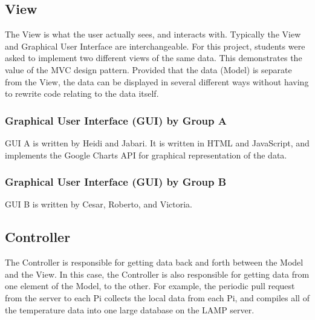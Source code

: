 \documentclass{article}
\begin{document}
		\subsection{View}
			The View is what the user actually sees, and interacts with. Typically the View and Graphical User Interface are interchangeable.
			For this project, students were asked to implement two different views of the same data. This demonstrates the value of
			the MVC design pattern. Provided that the data (Model) is separate from the View, the data can be displayed in several different
			ways without having to rewrite code relating to the data itself.		
		
			\subsubsection{Graphical User Interface (GUI) by Group A}
				GUI A is written by Heidi and Jabari. It is written in HTML and JavaScript, and implements the Google Charts API
				for graphical representation of the data.
			
			\subsubsection{Graphical User Interface (GUI) by Group B}
				GUI B is written by  Cesar, Roberto, and Victoria.
								
			
	\newpage		
			
		\subsection{Controller}
			The Controller is responsible for getting data back and forth between the Model and the View. In this case, the Controller
			is also responsible for getting data from one element of the Model, to the other. For example, the periodic pull request 
			from the server to each Pi collects the local data from each Pi, and compiles all of the temperature data into one large
			database on the LAMP server.
			
\end{document}
